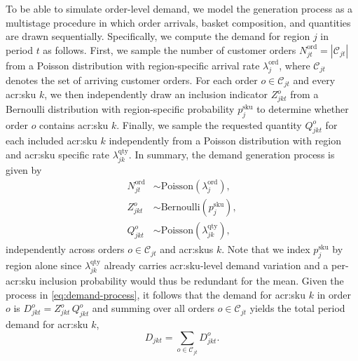 To be able to simulate order-level demand, we model the generation process as a multistage procedure in which order arrivals, basket composition, and quantities are drawn sequentially.  Specifically, we compute the demand for region $j$ in period $t$ as follows. First, we sample the number of customer orders $N^{\mathrm{ord}}_{jt} = |\mathcal{C}_{jt}|$ from a Poisson distribution with region-specific arrival rate $\lambda^{\mathrm{ord}}_{j}$, where $\mathcal{C}_{jt}$ denotes the set of arriving customer orders. For each order $o\in\mathcal{C}_{jt}$ and every \gls{acr:sku} $k$, we then independently draw an inclusion indicator $Z^{o}_{jkt}$ from a Bernoulli distribution with region-specific probability $p^{\mathrm{sku}}_{j}$ to determine whether order $o$ contains \gls{acr:sku} $k$. Finally, we sample the requested quantity $Q^{o}_{jkt}$ for each included \gls{acr:sku} $k$ independently from a Poisson distribution with region and \gls{acr:sku} specific rate $\lambda^{\mathrm{qty}}_{jk}$. In summary, the demand generation process is given by
\begin{equation}
\label{eq:demand-process}
\begin{aligned}
  N^{\mathrm{ord}}_{jt} &\sim \mathrm{Poisson}(\lambda^{\mathrm{ord}}_{j}), \\
  Z^{o}_{jkt}           &\sim \mathrm{Bernoulli}(p^{\mathrm{sku}}_{j}), \\
  Q^{o}_{jkt}           &\sim \mathrm{Poisson}(\lambda^{\mathrm{qty}}_{jk}),
\end{aligned}
\end{equation}
independently across orders $o \in \mathcal{C}_{jt}$ and \glspl{acr:sku} $k$. Note that we index $p^{\mathrm{sku}}_{j}$ by region alone since $\lambda^{\mathrm{qty}}_{jk}$ already carries \gls{acr:sku}-level demand variation and a per-\gls{acr:sku} inclusion probability would thus be redundant for the mean. Given the process in \autoref{eq:demand-process}, it follows that the demand for \gls{acr:sku} $k$ in order $o$ is $D^{o}_{jkt} = Z^{o}_{jkt}\,Q^{o}_{jkt}$ and summing over all orders $o \in \mathcal{C}_{jt}$ yields the total period demand for \gls{acr:sku} $k$,
\begin{equation}
\label{eq:total-demand}
  D_{jkt} = \sum_{o \in \mathcal{C}_{jt}} D^{o}_{jkt}.
\end{equation}

